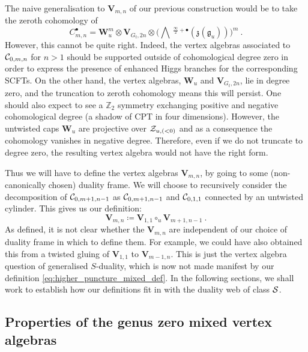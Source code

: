 \documentclass[a4paper]{article}
\def\IZ{\mathbb{Z}}
\def\CC{{\cal C}}
\def\SS{{\cal S}}
\def\ZZ{{\cal Z}}
\def\gf{\mathfrak{g}}
\def \zf{\mathfrak{z}}
\newcommand{\Li}[1]{\mathrm{\bigwedge}\,^{\frac{\infty}{2}+#1}}
\def\W{\mathbf{W}}
\def\V{\mathbf{V}}
\begin{document}
The naive generalisation to $\V_{m,n}$ of our previous construction would be to take the zeroth cohomology of
\begin{equation}
	C^{\bullet}_{m,n} = \W^{m}_u\otimes \V_{G_t,2n} \otimes \bigg( \Li{\bullet}(\zf(\gf_u))\bigg)^{m}~.
\end{equation}
However, this cannot be quite right. Indeed, the vertex algebras associated to $\CC_{0,m,n}$ for $n>1$ should be supported outside of cohomological degree zero in order to express the presence of enhanced Higgs branches for the corresponding SCFTs. On the other hand, the vertex algebras, $\W_u$ and $\V_{G_t,2n}$, lie in degree zero, and the truncation to zeroth cohomology means this will persist. One should also expect to see a $\IZ_2$ symmetry exchanging positive and negative cohomological degree (a shadow of CPT in four dimensions). However, the untwisted caps $\W_u$ are projective over $\ZZ_{u,(<0)}$ and as a consequence the cohomology vanishes in negative degree. Therefore, even if we do not truncate to degree zero, the resulting vertex algebra would not have the right form. 

Thus we will have to define the vertex algebras $\V_{m,n}$, by going to some (non-canonically chosen) duality frame. We will choose to recursively consider the decomposition of $\CC_{0,m+1,n-1}$ as $\CC_{0,m+1,n-1}$ and $\CC_{0,1,1}$ connected by an untwisted cylinder. This gives us our definition:
\begin{equation}\label{eq:higher_puncture_mixed_def}
	\V_{m,n}\coloneqq \V_{1,1}\circ_u\V_{m+1,n-1}~.
\end{equation}
As defined, it is not clear whether the $\V_{m,n}$ are independent of our choice of duality frame in which to define them. For example, we could have also obtained this from a twisted gluing of $\V_{1,1}$ to $\V_{m-1,n}$. This is just the vertex algebra question of generalised $S$-duality, which is now not made manifest by our definition \eqref{eq:higher_puncture_mixed_def}. In the following sections, we shall work to establish how our definitions fit in with the duality web of class $\SS$.

\subsection{\label{ssec:gluing_mixed}Properties of the genus zero mixed vertex algebras}
\end{document}
